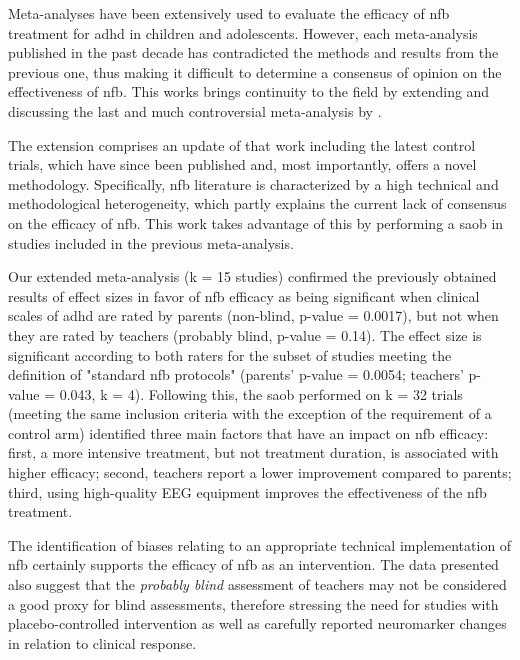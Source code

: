 

\noindent Meta-analyses have been extensively used to
evaluate the efficacy of \gls{nfb} treatment for \gls{adhd} in children and adolescents. 
However, each meta-analysis published in the past decade has contradicted the methods and
results from the previous one, thus making it difficult to determine a consensus of opinion
on the effectiveness of \gls{nfb}. This works brings continuity to the field by extending and discussing the last and much 
controversial meta-analysis by \citet{Cortese2016}. 

The extension comprises an update of that work including the latest control trials, 
which have since been published and, most importantly, offers a
novel methodology. Specifically, \gls{nfb} literature is characterized 
by a high technical and methodological heterogeneity, which partly explains the current lack of consensus on 
the efficacy of \gls{nfb}. This work takes advantage of this by performing a \gls{saob} in studies included in the previous meta-analysis.

Our extended meta-analysis (k = 15 studies) confirmed the previously
obtained results of effect sizes in favor of \gls{nfb} efficacy as being significant when clinical scales of \gls{adhd}
are rated by parents (non-blind, p-value = 0.0017), but not when they are rated by
teachers (probably blind, p-value = 0.14). The effect size is significant
according to both raters for the subset of studies meeting the definition of
"standard \gls{nfb} protocols" (parents' p-value = 0.0054; teachers' p-value = 0.043, k
= 4). Following this, the \gls{saob} performed on k = 32 trials (meeting the same inclusion
criteria with the exception of the requirement of a control arm)
identified three main factors that have an impact on \gls{nfb} efficacy: first, a more
intensive treatment, but not treatment duration, is associated with higher
efficacy; second, teachers report a lower improvement compared to parents;
third, using high-quality EEG equipment improves the effectiveness of the \gls{nfb} treatment.

The identification of biases relating to an appropriate technical implementation of \gls{nfb} 
certainly supports the efficacy of \gls{nfb} as an
intervention. The data presented also suggest that the \emph{probably blind} assessment of teachers may not
be considered a good proxy for blind assessments, therefore stressing the need for studies with placebo-controlled
intervention as well as carefully reported neuromarker changes in relation to clinical response.



